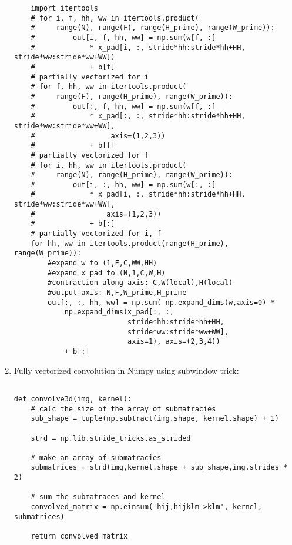 \documentclass[12pt,letter]{article}
\begin{document}
\begin{enumerate}
\begin{verbatim}
    import itertools
    # for i, f, hh, ww in itertools.product(
    #     range(N), range(F), range(H_prime), range(W_prime)):
    #         out[i, f, hh, ww] = np.sum(w[f, :]
    #             * x_pad[i, :, stride*hh:stride*hh+HH, stride*ww:stride*ww+WW]) 
    #             + b[f]
    # partially vectorized for i
    # for f, hh, ww in itertools.product(
    #     range(F), range(H_prime), range(W_prime)):
    #         out[:, f, hh, ww] = np.sum(w[f, :] 
    #             * x_pad[:, :, stride*hh:stride*hh+HH, stride*ww:stride*ww+WW],
    #                  axis=(1,2,3))
    #             + b[f]
    # partially vectorized for f
    # for i, hh, ww in itertools.product(
    #     range(N), range(H_prime), range(W_prime)):
    #         out[i, :, hh, ww] = np.sum(w[:, :] 
    #             * x_pad[i, :, stride*hh:stride*hh+HH, stride*ww:stride*ww+WW],
    #                 axis=(1,2,3))
    #             + b[:]
    # partially vectorized for i, f
    for hh, ww in itertools.product(range(H_prime), range(W_prime)):
        #expand w to (1,F,C,WW,HH)
        #expand x_pad to (N,1,C,W,H)
        #contraction along axis: C,W(local),H(local)
        #output axis: N,F,W_prime,H_prime
        out[:, :, hh, ww] = np.sum( np.expand_dims(w,axis=0) *
            np.expand_dims(x_pad[:, :, 
                           stride*hh:stride*hh+HH, 
                           stride*ww:stride*ww+WW],
                           axis=1), axis=(2,3,4))
            + b[:]
\end{verbatim}


\item Fully vectorized convolution in Numpy using subwindow trick:

\begin{verbatim}

def convolve3d(img, kernel):
    # calc the size of the array of submatracies
    sub_shape = tuple(np.subtract(img.shape, kernel.shape) + 1)

    strd = np.lib.stride_tricks.as_strided

    # make an array of submatracies
    submatrices = strd(img,kernel.shape + sub_shape,img.strides * 2)

    # sum the submatraces and kernel
    convolved_matrix = np.einsum('hij,hijklm->klm', kernel, submatrices)

    return convolved_matrix

\end{verbatim}
  
\end{enumerate}
\end{document}
